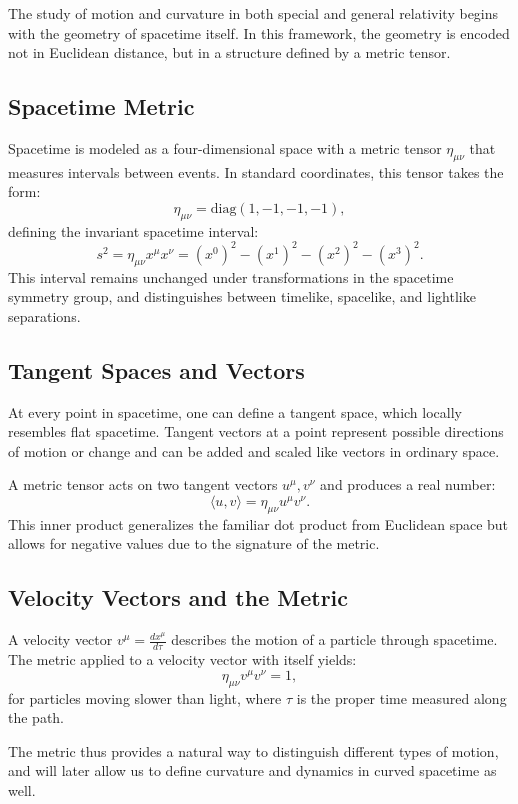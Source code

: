 \documentclass{amsart}
\theoremstyle{remark}
\begin{document}
The study of motion and curvature in both special and general relativity begins with the geometry of spacetime itself. In this framework, the geometry is encoded not in Euclidean distance, but in a structure defined by a metric tensor.

\subsection{Spacetime Metric}

Spacetime is modeled as a four-dimensional space with a metric tensor \(\eta_{\mu\nu}\) that measures intervals between events. In standard coordinates, this tensor takes the form:
\[
\eta_{\mu\nu} = \mathrm{diag}(1, -1, -1, -1),
\]
defining the invariant spacetime interval:
\[
s^2 = \eta_{\mu\nu} x^\mu x^\nu = (x^0)^2 - (x^1)^2 - (x^2)^2 - (x^3)^2.
\]
This interval remains unchanged under transformations in the spacetime symmetry group, and distinguishes between timelike, spacelike, and lightlike separations.

\subsection{Tangent Spaces and Vectors}

At every point in spacetime, one can define a tangent space, which locally resembles flat spacetime. Tangent vectors at a point represent possible directions of motion or change and can be added and scaled like vectors in ordinary space.

A metric tensor acts on two tangent vectors \(u^\mu, v^\nu\) and produces a real number:
\[
\langle u, v \rangle = \eta_{\mu\nu} u^\mu v^\nu.
\]
This inner product generalizes the familiar dot product from Euclidean space but allows for negative values due to the signature of the metric.

\subsection{Velocity Vectors and the Metric}

A velocity vector \(v^\mu = \frac{dx^\mu}{d\tau}\) describes the motion of a particle through spacetime. The metric applied to a velocity vector with itself yields:
\[
\eta_{\mu\nu} v^\mu v^\nu = 1,
\]
for particles moving slower than light, where \(\tau\) is the proper time measured along the path.

The metric thus provides a natural way to distinguish different types of motion, and will later allow us to define curvature and dynamics in curved spacetime as well.
\end{document}
